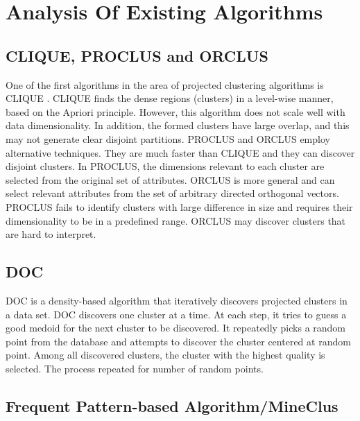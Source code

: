 \chapter{Analysis Of Existing Algorithms}
\label{Chapter2}

\section{CLIQUE, PROCLUS and ORCLUS}

One of the first algorithms in the area of projected clustering
algorithms is CLIQUE \cite{bib3}. CLIQUE finds the dense regions
(clusters) in a level-wise manner, based on the Apriori
principle. However, this algorithm does not scale well with
data dimensionality. In addition, the formed clusters have
large overlap, and this may not generate clear disjoint partitions. PROCLUS\cite{bib1} and ORCLUS\cite{bib2} employ alternative
techniques. They are much faster than CLIQUE and they
can discover disjoint clusters. In PROCLUS, the dimensions
relevant to each cluster are selected from the original set of
attributes. ORCLUS is more general and can select relevant attributes from the set of arbitrary directed orthogonal
vectors. PROCLUS fails to identify clusters with large difference in size and requires their dimensionality to be in a
predefined range. ORCLUS may discover clusters that are
hard to interpret.

\section{DOC}

DOC \cite{bib12} is a density-based algorithm that iteratively discovers projected clusters in a data set. DOC discovers one
cluster at a time. At each step, it tries to guess a good
medoid for the next cluster to be discovered. It repeatedly
picks a random point from the database and attempts to
discover the cluster centered at random point. Among all
discovered clusters, the cluster with the highest quality is selected. The process repeated for number of random points.

\section{Frequent Pattern-based Algorithm/MineClus}

